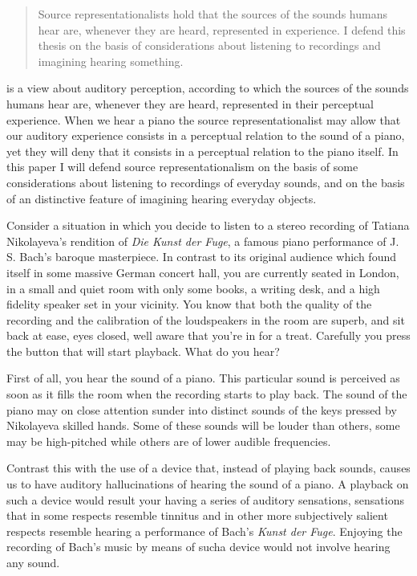 \documentclass[sloppy, journal, git, bytitle, dodraft]{humapap}
\begin{document}
\documenttitle

\begin{abstract}
Source representationalists hold that the sources of the sounds humans hear are, whenever they are heard, represented in experience. I defend this thesis on the basis of considerations about listening to recordings and imagining hearing something. 
\end{abstract}	

 is a view about auditory perception, according to which the sources of the sounds humans hear are, whenever they are heard, represented in their perceptual experience. When we hear a piano the source representationalist may allow that our auditory experience consists in a perceptual relation to the sound of a piano, yet they will deny that it consists in a perceptual relation to the piano itself. In this paper I will defend source representationalism on the basis of some considerations about listening to recordings of everyday sounds, and on the basis of an distinctive feature of imagining hearing everyday objects.

\sect Consider a situation in which you decide to listen to a stereo recording of Tatiana Nikolayeva's rendition of \emph{Die Kunst der Fuge}, a famous piano performance of J. S. Bach's baroque masterpiece. In contrast to its original audience which found itself in some massive German concert hall, you are currently seated in London, in a small and quiet room with only some books, a writing desk, and a high fidelity speaker set in your vicinity. You know that both the quality of the recording and the calibration of the loudspeakers in the room are superb, and sit back at ease, eyes closed, well aware that you're in for a treat. Carefully you press the button that will start playback. What do you hear? 

First of all, you hear the sound of a piano. This particular sound is perceived as soon as it fills the room when the recording starts to play back. The sound of the piano may on close attention sunder into distinct sounds of the keys pressed by Nikolayeva skilled hands. Some of these sounds will be louder than others, some may be high-pitched while others are  of lower audible frequencies.

Contrast this with the use of a device that, instead of playing back sounds, causes us to have auditory hallucinations of hearing the sound of a piano. A playback on such a device would result your having a series of auditory sensations, sensations that in some respects resemble tinnitus and in other more subjectively salient respects resemble hearing a performance of Bach's \emph{Kunst der Fuge}. Enjoying the recording of Bach's music by means of sucha device would not involve hearing any sound. 
\end{document}
